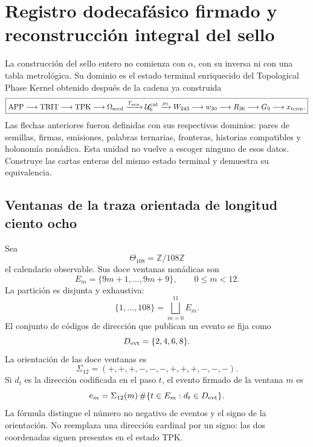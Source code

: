 
\chapter{Registro dodecafásico firmado y reconstrucción integral del sello}
\label{chap:registro-dodecafasico-hadamard-k}

La construcción del sello entero no comienza con \(\alpha\), con su inversa
ni con una tabla metrológica. Su dominio es el estado terminal enriquecido
del Topological Phase Kernel obtenido después de la cadena ya construida
\begin{equation}
 \boxed{
 \mathrm{APP}\longrightarrow\mathrm{TRIT}\longrightarrow\mathrm{TPK}
 \longrightarrow\Omega_{\rm seed}
 \xrightarrow{T_{\min}}\mathcal U_6^{\rm cat}
 \xrightarrow{\rho_3}W_{243}
 \longrightarrow w_{30}\longrightarrow R_{36}
 \longrightarrow G_9\longrightarrow x_{\rm term}.}
 \label{eq:cadena-upstream-registro-dodecafasico}
\end{equation}
Las flechas anteriores fueron definidas con sus respectivos dominios:
pares de semillas, firmas, emisiones, palabras ternarias, fronteras,
historias compatibles y holonomía nonádica. Esta unidad no vuelve a escoger
ninguno de esos datos. Construye las cartas enteras del mismo estado
terminal y demuestra su equivalencia.

\section{Ventanas de la traza orientada de longitud ciento ocho}

Sea
\[
 \Theta_{108}=\mathbb Z/108\mathbb Z
\]
el calendario observable. Sus doce ventanas nonádicas son
\[
 E_m=\{9m+1,\ldots,9m+9\},
 \qquad 0\leq m<12.
\]
La partición es disjunta y exhaustiva:
\[
 \{1,\ldots,108\}=\bigsqcup_{m=0}^{11}E_m.
\]
El conjunto de códigos de dirección que publican un evento se fija como
\[
 D_{\rm evt}=\{2,4,6,8\}.
\]
La orientación de las doce ventanas es
\begin{equation}
 \Sigma_{12}=(+,+,+,-,-,-,+,+,+,-,-,-).
 \label{eq:signatura-doce-ventanas}
\end{equation}
Si \(d_t\) es la dirección codificada en el paso \(t\), el evento firmado
de la ventana \(m\) es
\begin{equation}
 e_m=\Sigma_{12}(m)\,
 \#\{t\in E_m:d_t\in D_{\rm evt}\}.
 \label{eq:evento-firmado-ventana}
\end{equation}
La fórmula distingue el número no negativo de eventos y el signo de la
orientación. No reemplaza una dirección cardinal por un signo: las dos
coordenadas siguen presentes en el estado TPK.

